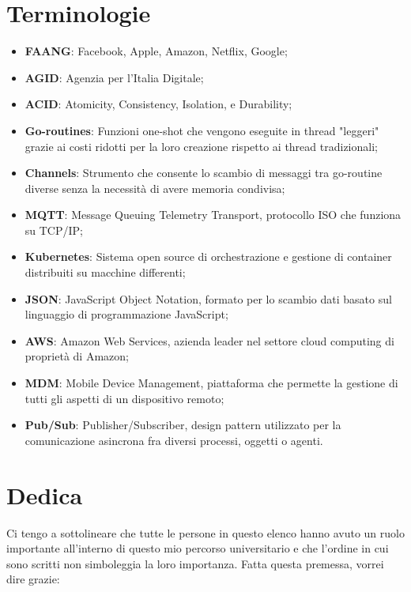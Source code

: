 \documentclass[a4paper, titlepage, 12pt, openright, oneside]{book}
\begin{document}
\chapter{Terminologie}\label{chap:terminologie}

\begin{itemize}
	\item \textbf{FAANG}: Facebook, Apple, Amazon, Netflix, Google;
	\item \textbf{AGID}: Agenzia per l'Italia Digitale;
	\item \textbf{ACID}: Atomicity, Consistency, Isolation, e Durability;
	\item \textbf{Go-routines}: Funzioni one-shot che vengono eseguite in thread "leggeri" grazie ai costi ridotti per la loro creazione rispetto ai thread tradizionali;
	\item \textbf{Channels}: Strumento che consente lo scambio di messaggi tra go-routine diverse senza la necessità di avere memoria condivisa;
	\item \textbf{MQTT}: Message Queuing Telemetry Transport, protocollo ISO che funziona su TCP/IP;
	\item \textbf{Kubernetes}: Sistema open source di orchestrazione e gestione di container distribuiti su macchine differenti;
	\item \textbf{JSON}: JavaScript Object Notation, formato per lo scambio dati basato sul linguaggio di programmazione JavaScript;
	\item \textbf{AWS}: Amazon Web Services, azienda leader nel settore cloud computing di proprietà di Amazon;
	\item \textbf{MDM}: Mobile Device Management, piattaforma che permette la gestione di tutti gli aspetti di un dispositivo remoto;
	\item \textbf{Pub/Sub}: Publisher/Subscriber, design pattern utilizzato per la comunicazione asincrona fra diversi processi, oggetti o agenti.
\end{itemize}

\chapter{Dedica}\label{chap:dedica}

Ci tengo a sottolineare che tutte le persone in questo elenco hanno avuto un ruolo importante all'interno di questo mio percorso universitario e che l'ordine in cui sono scritti non simboleggia la loro importanza. Fatta questa premessa, vorrei dire grazie:
\end{document}
